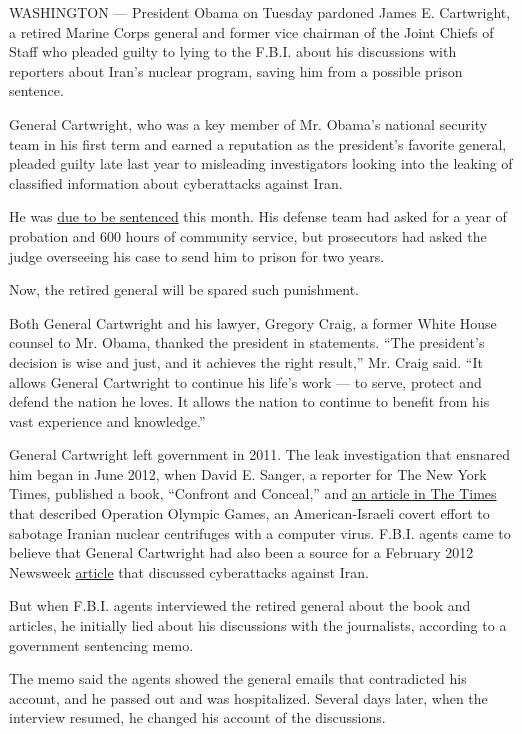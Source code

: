 WASHINGTON --- President Obama on Tuesday pardoned James E. Cartwright,
a retired Marine Corps general and former vice chairman of the Joint
Chiefs of Staff who pleaded guilty to lying to the F.B.I. about his
discussions with reporters about Iran's nuclear program, saving him from
a possible prison sentence.

General Cartwright, who was a key member of Mr. Obama's national
security team in his first term and earned a reputation as the
president's favorite general, pleaded guilty late last year to
misleading investigators looking into the leaking of classified
information about cyberattacks against Iran.

He was
\href{https://www.nytimes.com/2017/01/10/us/politics/leak-iran-james-cartwright.html}{due
to be sentenced} this month. His defense team had asked for a year of
probation and 600 hours of community service, but prosecutors had asked
the judge overseeing his case to send him to prison for two years.

Now, the retired general will be spared such punishment.

Both General Cartwright and his lawyer, Gregory Craig, a former White
House counsel to Mr. Obama, thanked the president in statements. ``The
president's decision is wise and just, and it achieves the right
result,'' Mr. Craig said. ``It allows General Cartwright to continue his
life's work --- to serve, protect and defend the nation he loves. It
allows the nation to continue to benefit from his vast experience and
knowledge.''

General Cartwright left government in 2011. The leak investigation that
ensnared him began in June 2012, when David E. Sanger, a reporter for
The New York Times, published a book, ``Confront and Conceal,'' and
\href{http://www.nytimes.com/2012/06/01/world/middleeast/obama-ordered-wave-of-cyberattacks-against-iran.html}{an
article in The Times} that described Operation Olympic Games, an
American-Israeli covert effort to sabotage Iranian nuclear centrifuges
with a computer virus. F.B.I. agents came to believe that General
Cartwright had also been a source for a February 2012 Newsweek
\href{http://www.newsweek.com/obamas-dangerous-game-iran-65711}{article}
that discussed cyberattacks against Iran.

But when F.B.I. agents interviewed the retired general about the book
and articles, he initially lied about his discussions with the
journalists, according to a government sentencing memo.

The memo said the agents showed the general emails that contradicted his
account, and he passed out and was hospitalized. Several days later,
when the interview resumed, he changed his account of the discussions.

